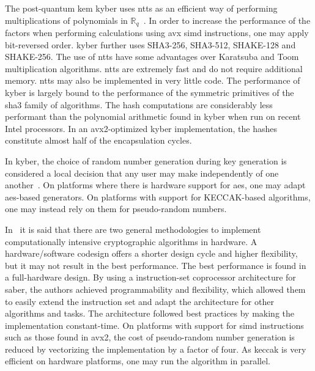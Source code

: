 
The \gls{post-quantum} \gls{kem} \gls{kyber} uses \glspl{ntt} as an efficient way of performing multiplications of polynomials in $\mathbb{R}_q$~\cite{kyber2021}. In order to increase the performance of the factors when performing calculations using \gls{avx} \gls{simd} instructions, one may apply bit-reversed order. \gls{kyber} further uses SHA3-256, SHA3-512, SHAKE-128 and SHAKE-256. The use of \glspl{ntt} have some advantages over Karatsuba and Toom multiplication algorithms. \glspl{ntt} are extremely fast and do not require additional memory. \glspl{ntt} may also be implemented in very little code. The performance of \gls{kyber} is largely bound to the performance of the symmetric primitives of the \gls{sha3} family of algorithms. The hash computations are considerably less performant than the polynomial arithmetic found in \gls{kyber} when run on recent Intel processors. In an \gls{avx2}-optimized \gls{kyber} implementation, the hashes constitute almost half of the encapsulation cycles.

In \gls{kyber}, the choice of random number generation during key generation is considered a local decision that any user may make independently of one another~\cite{kyber2021}. On platforms where there is hardware support for \gls{aes}, one may adapt \gls{aes}-based generators. On platforms with support for KECCAK-based algorithms, one may instead rely on them for pseudo-random numbers.


In~\cite{roy2020} it is said that there are two general methodologies to implement computationally intensive cryptographic algorithms in hardware. A hardware/software codesign offers a shorter design cycle and higher flexibility, but it may not result in the best performance. The best performance is found in a full-hardware design. By using a instruction-set coprocessor architecture for \gls{saber}, the authors achieved programmability and flexibility, which allowed them to easily extend the instruction set and adapt the architecture for other algorithms and tasks. The architecture followed best practices by making the implementation constant-time. On platforms with support for \gls{simd} instructions such as those found in \gls{avx2}, the cost of pseudo-random number generation is reduced by vectorizing the implementation by a factor of four. As \gls{keccak} is very efficient on hardware platforms, one may run the algorithm in parallel.